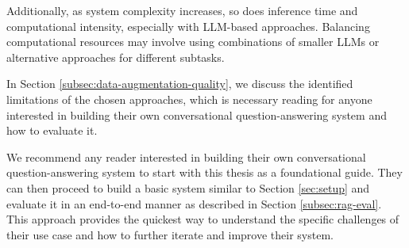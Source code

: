 Additionally, as system complexity increases, so does inference time and computational intensity, especially with LLM-based approaches. Balancing computational resources may involve using combinations of smaller LLMs or alternative approaches for different subtasks.

In Section \ref{subsec:data-augmentation-quality}, we discuss the identified limitations of the chosen approaches, which is necessary reading for anyone interested in building their own conversational question-answering system and how to evaluate it.

\vspace{\baselineskip}
\noindent We recommend any reader interested in building their own conversational question-answering system to start with this thesis as a foundational guide. They can then proceed to build a basic system similar to Section \ref{sec:setup} and evaluate it in an end-to-end manner as described in Section \ref{subsec:rag-eval}. This approach provides the quickest way to understand the specific challenges of their use case and how to further iterate and improve their system.


